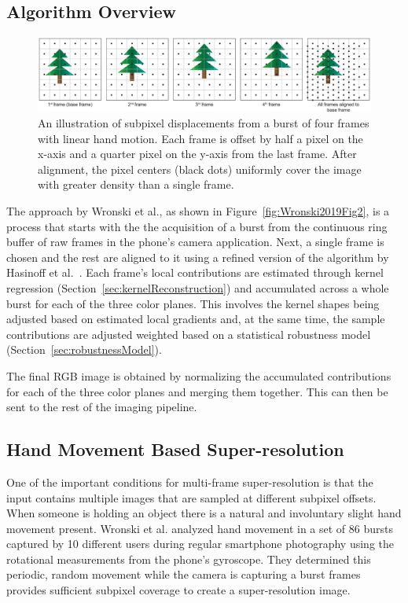 \documentclass{sig-alternate}
\begin{document}
\subsection{Algorithm Overview}

\begin{figure}
\centering
\includegraphics[width=\textwidth]{Wronski2019-figure-4}
\caption{An illustration of subpixel displacements from a burst of four frames with linear hand motion. Each frame is offset by half a pixel on the x-axis and a quarter pixel on the y-axis from the last frame. After alignment, the pixel centers (black dots) uniformly cover the image with greater density than a single frame.~\cite{Wronski2019}}
\label{fig:Wronski2019Fig4}
\end{figure}

The approach by Wronski et al., as shown in Figure~\ref{fig:Wronski2019Fig2}, is a process that starts with the the acquisition of a burst from the continuous ring buffer of raw frames in the phone's camera application. Next, a single frame is chosen and the rest are aligned to it using a refined version of the algorithm by Hasinoff et al.~\cite{Hasinoff2016}.
Each frame's local contributions are estimated through kernel regression (Section~\ref{sec:kernelReconstruction}) and accumulated across a whole burst for each of the three color planes. This involves the kernel shapes being adjusted based on estimated local gradients and, at the same time, the sample contributions are adjusted weighted based on a statistical robustness model (Section~\ref{sec:robustnessModel}).


The final RGB image is obtained by normalizing the accumulated contributions for each of the three color planes and merging them together. This can then be sent to the rest of the imaging pipeline.

\subsection{Hand Movement Based Super-resolution}

One of the important conditions for multi-frame super-resolution is that the input contains multiple images that are sampled at different subpixel offsets. When someone is holding an object there is a natural and involuntary slight hand movement present. Wronski et al. analyzed hand movement in a set of 86 bursts captured by 10 different users during regular smartphone photography using the rotational measurements from the phone's gyroscope. They determined this periodic, random movement while the camera is capturing a burst frames provides sufficient subpixel coverage to create a super-resolution image.
\end{document}
